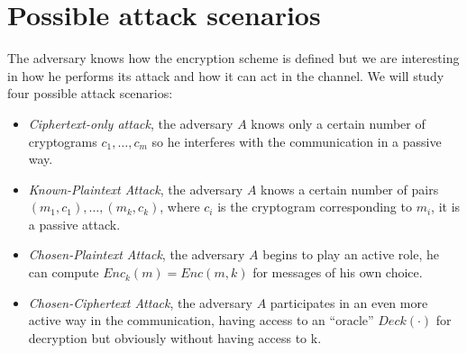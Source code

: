 \documentclass[../main]{subfiles}
\begin{document}
\section{Possible attack scenarios}
The adversary knows how the encryption scheme is defined but we are interesting in how he performs its attack and how it can act in the channel. We will study four possible attack scenarios:
\begin{itemize}
    \item \textit{Ciphertext-only attack}, the adversary $A$ knows only a certain number of cryptograms $c_1, \dotsc, c_m$ so he interferes with the communication in a passive way.
    \item \textit{Known-Plaintext Attack}, the adversary $A$ knows a certain number of pairs $(m_1, c_1), \dotsc{},(m_k, c_k)$, where $c_i$ is the cryptogram corresponding to $m_i$, it is a passive attack.
    \item \textit{Chosen-Plaintext Attack}, the adversary $A$ begins to play an active role, he can compute $Enc_k(m) = Enc(m, k)$ for messages of his own choice.
    \item \textit{Chosen-Ciphertext Attack}, the adversary $A$ participates in an even more active way in the communication, having access to an “oracle” $Deck(\cdot{})$ for decryption but obviously without having access to k.
\end{itemize}
\end{document}
